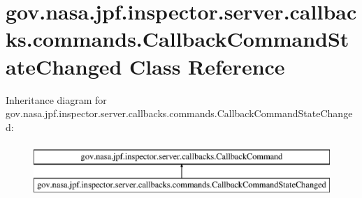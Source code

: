 \hypertarget{classgov_1_1nasa_1_1jpf_1_1inspector_1_1server_1_1callbacks_1_1commands_1_1_callback_command_state_changed}{}\section{gov.\+nasa.\+jpf.\+inspector.\+server.\+callbacks.\+commands.\+Callback\+Command\+State\+Changed Class Reference}
\label{classgov_1_1nasa_1_1jpf_1_1inspector_1_1server_1_1callbacks_1_1commands_1_1_callback_command_state_changed}
Inheritance diagram for gov.\+nasa.\+jpf.\+inspector.\+server.\+callbacks.\+commands.\+Callback\+Command\+State\+Changed\+:\begin{figure}[H]
\begin{center}
\leavevmode
\includegraphics[height=2.000000cm]{classgov_1_1nasa_1_1jpf_1_1inspector_1_1server_1_1callbacks_1_1commands_1_1_callback_command_state_changed}
\end{center}
\end{figure}
